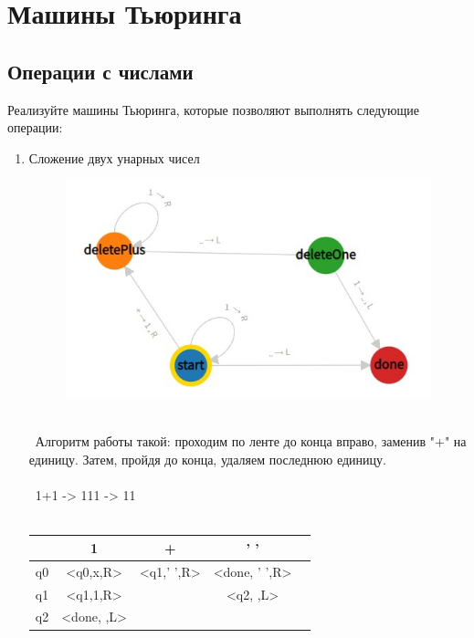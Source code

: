 \documentclass{article}
\title{\text{Домашняя работа №3}}
\author{\text{Шамриков Алексей А-05-19} }
\begin{document}
\maketitle
\section{Машины Тьюринга}

\subsection{Операции с числами}

Реализуйте машины Тьюринга, которые позволяют выполнять следующие операции:
\begin{enumerate}
    \item Сложение двух унарных чисел
    \begin{figure}[h]
        \centering
        \includegraphics[width=14cm]{pictures/1.1.jpg}
    \end{figure}
\\
\ Алгоритм работы такой: проходим по ленте до конца вправо, заменив "+" на единицу. Затем, пройдя до конца, удаляем последнюю единицу. \\ \\
\ 1+1 -> 111 -> 11\\
\\
\begin{tabular}{|*{5}{c|}}
\hline
\textbf{ } & 1 & + & ' '\\
\hline\hline
q0 & <q0,x,R> & <q1,' ',R>  & <done, ' ',R> \\
\hline\hline
q1 & <q1,1,R> &  & <q2, ,L>\\
\hline\hline
q2 & <done, ,L> & & \\
\hline\hline
\hline
\end{tabular}

\end{enumerate}
\end{document}
